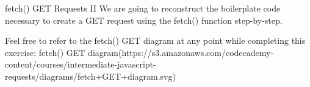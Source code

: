 fetch() GET Requests II
    We are going to reconstruct the boilerplate code necessary to create a GET request using the fetch() function step-by-step.

    Feel free to refer to the fetch() GET diagram at any point while completing this exercise:
        fetch() GET diagram(https://s3.amazonaws.com/codecademy-content/courses/intermediate-javascript-requests/diagrams/fetch+GET+diagram.svg)